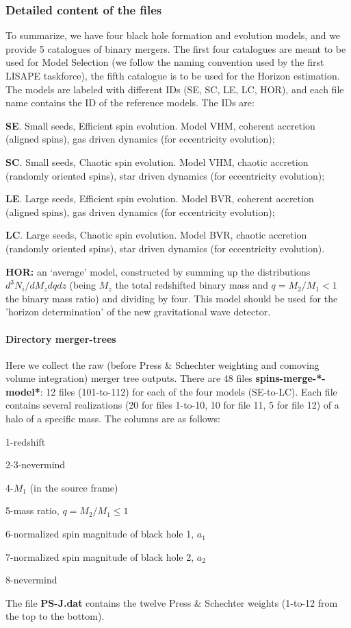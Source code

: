 \documentclass{iopart}
\newenvironment{itemize_estret}{
\begin{itemize}
  \setlength{\itemsep}{1pt}
  \setlength{\parskip}{0pt}
  \setlength{\parsep}{0pt}
}{\end{itemize}}
\begin{document}
\subsubsection{Detailed content of the files}
To summarize, we have four black hole formation and evolution models, and 
we provide 5 catalogues of binary mergers. The first four catalogues
are meant to be used for Model Selection (we follow the naming convention used by the 
first LISAPE taskforce), the fifth catalogue is to be used for the Horizon estimation. 
The  models are labeled with different IDs (SE, SC, LE, LC, HOR), and each file
name contains the ID of the reference models. The IDs are:
\begin{itemize_estret}
\item {\bf SE}. Small seeds, Efficient spin evolution. Model VHM, coherent accretion (aligned spins), gas 
driven dynamics (for eccentricity evolution); 
\item {\bf SC}. Small seeds, Chaotic spin evolution. Model VHM, chaotic accretion (randomly oriented spins), star 
driven dynamics (for eccentricity evolution); 
\item {\bf LE}. Large seeds, Efficient spin evolution. Model BVR, coherent accretion (aligned spins), gas 
driven dynamics (for eccentricity evolution); 
\item {\bf LC}. Large seeds, Chaotic spin evolution. Model BVR, chaotic accretion (randomly oriented spins), star 
driven dynamics (for eccentricity evolution). 
\item {\bf HOR:} an `average' model, constructed by summing up the distributions $d^3N_i/dM_zdqdz$ 
(being $M_z$ the total redshifted binary mass and $q=M_2/M_1<1$ 
the binary mass ratio)  and dividing by four. This model should be used for the 'horizon determination'
of the new gravitational wave detector.
\end{itemize_estret}

\paragraph{Directory merger-trees}
Here we collect the raw (before Press \& Schechter weighting and comoving 
volume integration) merger tree outputs. There are 48 files
{\bf spins-merge-*-model*}: 12 files (101-to-112) 
for each of the four models (SE-to-LC).
Each file contains several realizations (20 for files 1-to-10, 10 for
file 11, 5 for file 12) of a halo of a specific mass. The columns
are as follows:
\begin{itemize_estret}
\item 1-redshift
\item 2-3-nevermind
\item 4-$M_1$ (in the source frame)
\item 5-mass ratio, $q=M_2/M_1\leqslant 1$
\item 6-normalized spin magnitude of black hole 1, $a_1$
\item 7-normalized spin magnitude of black hole 2, $a_2$
\item 8-nevermind
\end{itemize_estret}
The file {\bf PS-J.dat} contains the twelve Press \& Schechter weights (1-to-12 from the top to the bottom).
\end{document}
